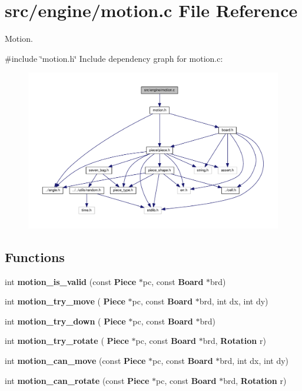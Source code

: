 \section{src/engine/motion.c File Reference}
\label{motion_8c}


Motion.  


{\ttfamily \#include \char`\"{}motion.\+h\char`\"{}}\newline
Include dependency graph for motion.\+c\+:
\nopagebreak
\begin{figure}[H]
\begin{center}
\leavevmode
\includegraphics[width=350pt]{motion_8c__incl}
\end{center}
\end{figure}
\subsection*{Functions}
\begin{DoxyCompactItemize}
\item 
int \textbf{ motion\+\_\+is\+\_\+valid} (const \textbf{ Piece} $\ast$pc, const \textbf{ Board} $\ast$brd)
\item 
int \textbf{ motion\+\_\+try\+\_\+move} (\textbf{ Piece} $\ast$pc, const \textbf{ Board} $\ast$brd, int dx, int dy)
\item 
int \textbf{ motion\+\_\+try\+\_\+down} (\textbf{ Piece} $\ast$pc, const \textbf{ Board} $\ast$brd)
\item 
int \textbf{ motion\+\_\+try\+\_\+rotate} (\textbf{ Piece} $\ast$pc, const \textbf{ Board} $\ast$brd, \textbf{ Rotation} r)
\item 
int \textbf{ motion\+\_\+can\+\_\+move} (const \textbf{ Piece} $\ast$pc, const \textbf{ Board} $\ast$brd, int dx, int dy)
\item 
int \textbf{ motion\+\_\+can\+\_\+rotate} (const \textbf{ Piece} $\ast$pc, const \textbf{ Board} $\ast$brd, \textbf{ Rotation} r)
\end{DoxyCompactItemize}



